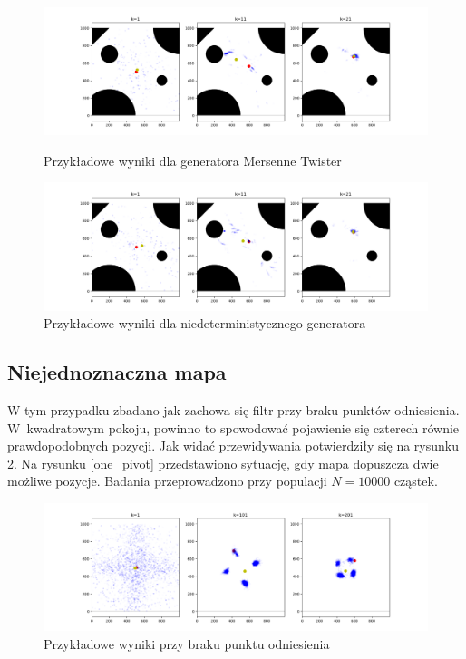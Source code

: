 \begin{figure}[H]
	\begin{center}
		\includegraphics[width=15cm]{./mersenne_example.png}
		\caption{Przykładowe wyniki dla generatora Mersenne Twister}
		\label{mersenne_example}
	\end{center}

\begin{center}
	\includegraphics[width=15cm]{./device_example.png}
	\caption{Przykładowe wyniki dla niedeterministycznego generatora}
	\label{device_example}
\end{center}
\end{figure}


\subsection{Niejednoznaczna mapa}
W tym przypadku zbadano jak zachowa się filtr przy braku punktów odniesienia. W~kwadratowym pokoju, powinno to spowodować pojawienie się czterech równie prawdopodobnych pozycji. Jak widać przewidywania potwierdziły się na rysunku \ref{no_pivot}. Na rysunku \ref{one_pivot} przedstawiono sytuację, gdy mapa dopuszcza dwie możliwe pozycje. Badania przeprowadzono przy populacji $N=10000$ cząstek.

\begin{figure}[H]
	\begin{center}
		\includegraphics[width=15cm]{./no_pivot.png}
		\caption{Przykładowe wyniki przy braku punktu odniesienia}
		\label{no_pivot}
	\end{center}
\end{figure}

